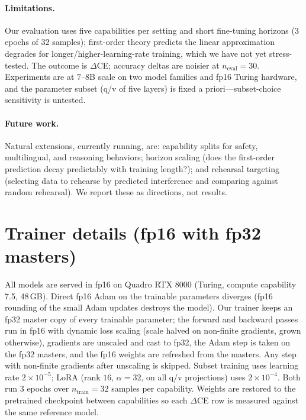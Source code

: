 \documentclass{article} %
\begin{document}
\paragraph{Limitations.}
Our evaluation uses five capabilities per setting and short fine-tuning horizons ($3$ epochs of
$32$ samples); first-order theory predicts the linear approximation degrades for
longer/higher-learning-rate training, which we have not yet stress-tested. The outcome is
$\Delta$CE; accuracy deltas are noisier at $n_{\text{eval}}=30$. Experiments are at $7$--$8$B
scale on two model families and fp16 Turing hardware, and the parameter subset (q/v of five
layers) is fixed a priori---subset-choice sensitivity is untested.

\paragraph{Future work.}
Natural extensions, currently running, are: capability splits for safety, multilingual, and
reasoning behaviors; horizon scaling (does the first-order prediction decay predictably with
training length?); and rehearsal targeting (selecting data to rehearse by predicted interference
and comparing against random rehearsal). We report these as directions, not results.




\appendix

\section{Trainer details (fp16 with fp32 masters)}
\label{app:trainer}

All models are served in fp16 on Quadro RTX 8000 (Turing, compute capability 7.5, 48\,GB). Direct
fp16 Adam on the trainable parameters diverges (fp16 rounding of the small Adam updates destroys
the model). Our trainer keeps an fp32 master copy of every trainable parameter; the forward and
backward passes run in fp16 with dynamic loss scaling (scale halved on non-finite gradients,
grown otherwise), gradients are unscaled and cast to fp32, the Adam step is taken on the fp32
masters, and the fp16 weights are refreshed from the masters. Any step with non-finite gradients
after unscaling is skipped. Subset training uses learning rate $2\times10^{-5}$; LoRA (rank $16$,
$\alpha=32$, on all q/v projections) uses $2\times10^{-4}$. Both run $3$ epochs over
$n_{\text{train}}=32$ samples per capability. Weights are restored to the pretrained checkpoint
between capabilities so each $\Delta$CE row is measured against the same reference model.
\end{document}
